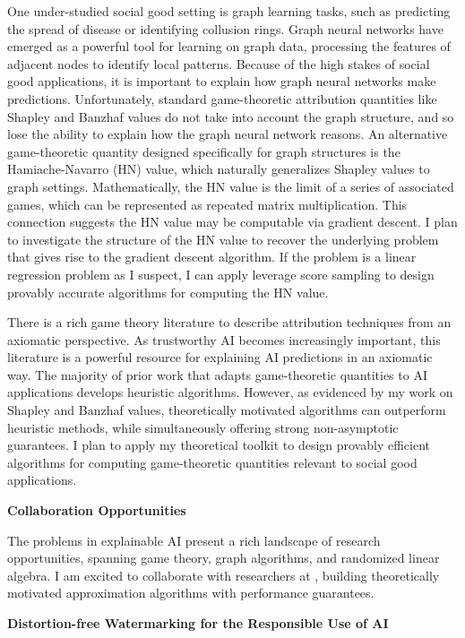 \documentclass[11pt]{article}
\begin{document}
{One under-studied social good setting is graph learning tasks, such as predicting the spread of disease or identifying collusion rings.
Graph neural networks have emerged as a powerful tool for learning on graph data, processing the features of adjacent nodes to identify local patterns.
Because of the high stakes of social good applications, it is important to explain how graph neural networks make predictions.
Unfortunately, standard game-theoretic attribution quantities like Shapley and Banzhaf values do not take into account the graph structure, and so lose the ability to explain how the graph neural network reasons.
An alternative game-theoretic quantity designed specifically for graph structures is the Hamiache-Navarro (HN) value, which naturally generalizes Shapley values to graph settings.
Mathematically, the HN value is the limit of a series of associated games, which can be represented as repeated matrix multiplication.
This connection suggests the HN value may be computable via gradient descent.
I plan to investigate the structure of the HN value to recover the underlying problem that gives rise to the gradient descent algorithm.
If the problem is a linear regression problem as I suspect, I can apply leverage score sampling to design provably accurate algorithms for computing the HN value.

There is a rich game theory literature to describe attribution techniques from an axiomatic perspective.
As trustworthy AI becomes increasingly important, this literature is a powerful resource for explaining AI predictions in an axiomatic way.
The majority of prior work that adapts game-theoretic quantities to AI applications develops heuristic algorithms.
However, as evidenced by my work on Shapley and Banzhaf values, theoretically motivated algorithms can outperform heuristic methods, while simultaneously offering strong non-asymptotic guarantees.
I plan to apply my theoretical toolkit to design provably efficient algorithms for computing game-theoretic quantities relevant to social good applications. 

{ \large \textbf{Collaboration Opportunities}}

The problems in explainable AI present a rich landscape of research opportunities, spanning game theory, graph algorithms, and randomized linear algebra.
I am excited to collaborate with researchers at \school, building theoretically motivated approximation algorithms with performance guarantees.

\begin{center}
{ \large \textbf{Distortion-free Watermarking for the Responsible Use of AI}}
\end{center}

}
\end{document}
